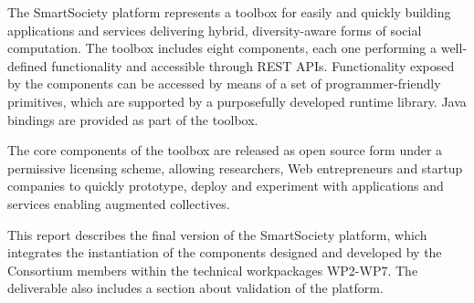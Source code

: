 The SmartSociety platform represents a toolbox for easily and quickly building applications and services delivering hybrid, diversity-aware forms of social computation. The toolbox includes eight components, each one performing a well-defined functionality and accessible through REST APIs. Functionality exposed by the components can be accessed by means of a set of programmer-friendly primitives, which are supported by a purposefully developed runtime library. Java bindings are provided as part of the toolbox. 

The core components of the toolbox are released as open source form under a permissive licensing scheme, allowing researchers, Web entrepreneurs and startup companies to quickly prototype, deploy and experiment with applications and services enabling augmented collectives.

This report describes the final version of the SmartSociety platform, which integrates the instantiation of the components designed and developed by the Consortium members within the technical workpackages WP2-WP7. The deliverable also includes a section about validation of the platform. 